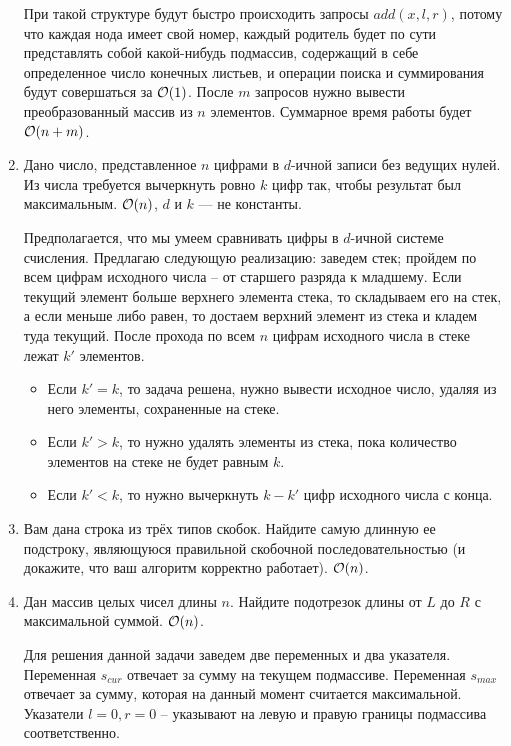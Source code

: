 \begin{enumerate}
\begin{solution}
      При такой структуре будут быстро происходить запросы $add(x, l, r)$, потому что каждая нода имеет свой номер, каждый родитель будет по сути представлять собой какой-нибудь подмассив, содержащий в себе определенное число конечных листьев, и операции поиска и суммирования будут совершаться за $\mathcal{O}(1)$. После $m$ запросов нужно вывести преобразованный массив из $n$ элементов. Суммарное время работы будет $\mathcal{O}(n + m)$.
    \end{solution}

  \item
    Дано число, представленное $n$ цифрами в $d$-ичной записи без
    ведущих нулей.  Из числа требуется вычеркнуть ровно $k$ цифр так,
    чтобы результат был максимальным. $\mathcal{O}(n)$, $d$ и $k$ --- не константы.
    \begin{solution}
      Предполагается, что мы умеем сравнивать цифры в $d$-ичной системе счисления. Предлагаю следующую реализацию: заведем стек; пройдем по всем цифрам исходного числа -- от старшего разряда к младшему. Если текущий элемент больше верхнего элемента стека, то складываем его на стек, а если меньше либо равен, то достаем верхний элемент из стека и кладем туда текущий. После прохода по всем $n$ цифрам исходного числа в стеке лежат $k'$ элементов.
      \begin{itemize}
        \item Если $k' = k$, то задача решена, нужно вывести исходное число, удаляя из него элементы, сохраненные на стеке.
        \item Если $k' > k$, то нужно удалять элементы из стека, пока количество элементов на стеке не будет равным $k$.
        \item Если $k' < k$, то нужно вычеркнуть $k - k'$ цифр исходного числа с конца.
      \end{itemize}
    \end{solution}
    
  \item {}
    Вам дана строка из трёх типов скобок. Найдите самую длинную ее
    подстроку, являющуюся правильной скобочной последовательностью
    (и докажите, что ваш алгоритм корректно работает). $\mathcal{O}(n)$.

  \item
    Дан массив целых чисел длины $n$. Найдите подотрезок длины
    от $L$ до $R$ с максимальной суммой. $\mathcal{O}(n)$.
    \begin{solution}
      Для решения данной задачи заведем две переменных и два указателя. Переменная $s_{cur}$ отвечает за сумму на текущем подмассиве. Переменная $s_{max}$ отвечает за сумму, которая на данный момент считается максимальной. Указатели $l = 0, r = 0$ -- указывают на левую и правую границы подмассива соответственно.


\end{solution}
\end{enumerate}
